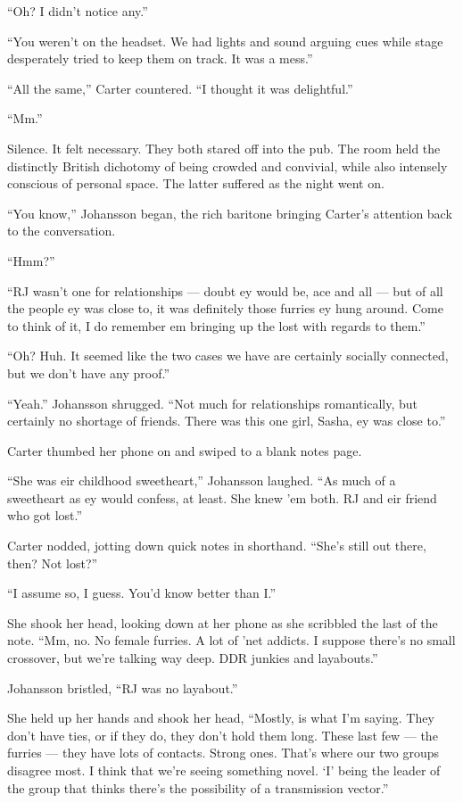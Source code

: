 ``Oh? I didn't notice any.''

``You weren't on the headset. We had lights and sound arguing cues while stage desperately tried to keep them on track. It was a mess.''

``All the same,'' Carter countered. ``I thought it was delightful.''

``Mm.''

Silence. It felt necessary. They both stared off into the pub. The room held the distinctly British dichotomy of being crowded and convivial, while also intensely conscious of personal space. The latter suffered as the night went on.

``You know,'' Johansson began, the rich baritone bringing Carter's attention back to the conversation.

``Hmm?''

``RJ wasn't one for relationships — doubt ey would be, ace and all — but of all the people ey was close to, it was definitely those furries ey hung around. Come to think of it, I do remember em bringing up the lost with regards to them.''

``Oh? Huh. It seemed like the two cases we have are certainly socially connected, but we don't have any proof.''

``Yeah.'' Johansson shrugged. ``Not much for relationships romantically, but certainly no shortage of friends. There was this one girl, Sasha, ey was close to.''

Carter thumbed her phone on and swiped to a blank notes page.

``She was eir childhood sweetheart,'' Johansson laughed. ``As much of a sweetheart as ey would confess, at least. She knew 'em both. RJ and eir friend who got lost.''

Carter nodded, jotting down quick notes in shorthand. ``She's still out there, then? Not lost?''

``I assume so, I guess. You'd know better than I.''

She shook her head, looking down at her phone as she scribbled the last of the note. ``Mm, no. No female furries. A lot of 'net addicts. I suppose there's no small crossover, but we're talking way deep. DDR junkies and layabouts.''

Johansson bristled, ``RJ was no layabout.''

She held up her hands and shook her head, ``Mostly, is what I'm saying. They don't have ties, or if they do, they don't hold them long. These last few — the furries — they have lots of contacts. Strong ones. That's where our two groups disagree most. I think that we're seeing something novel. `I' being the leader of the group that thinks there's the possibility of a transmission vector.''

